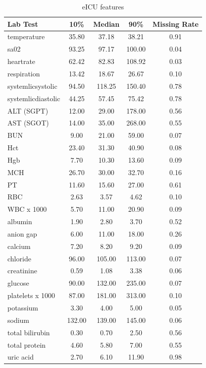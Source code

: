 \begin{table}[h!]
\centering
\caption{eICU features}
\label{app:table_eicu_features}
\begin{tabular}{lcccc}
    \toprule
    Lab Test & 10\% & Median & 90\% & Missing Rate \\
    \midrule
    temperature & 35.80 & 37.18 & 38.21 & 0.91 \\
    sa02 & 93.25 & 97.17 & 100.00 & 0.04 \\
    heartrate & 62.42 & 82.83 & 108.92 & 0.03 \\
    respiration & 13.42 & 18.67 & 26.67 & 0.10 \\
    systemlicsystolic & 94.50 & 118.25 & 150.40 & 0.78 \\
    systemlicdiastolic & 44.25 & 57.45 & 75.42 & 0.78 \\
    ALT (SGPT) & 12.00 & 29.00 & 178.00 & 0.56 \\
    AST (SGOT) & 14.00 & 35.00 & 268.00 & 0.55 \\
    BUN & 9.00 & 21.00 & 59.00 & 0.07 \\
    Hct & 23.40 & 31.30 & 40.90 & 0.08 \\
    Hgb & 7.70 & 10.30 & 13.60 & 0.09 \\
    MCH & 26.70 & 30.00 & 32.70 & 0.16 \\
    PT & 11.60 & 15.60 & 27.00 & 0.61 \\
    RBC & 2.63 & 3.57 & 4.62 & 0.10 \\
    WBC x 1000 & 5.70 & 11.00 & 20.90 & 0.09 \\
    albumin & 1.90 & 2.80 & 3.70 & 0.52 \\
    anion gap & 6.00 & 11.00 & 18.00 & 0.26 \\
    calcium & 7.20 & 8.20 & 9.20 & 0.09 \\
    chloride & 96.00 & 105.00 & 113.00 & 0.07 \\
    creatinine & 0.59 & 1.08 & 3.38 & 0.06 \\
    glucose & 90.00 & 132.00 & 235.00 & 0.07 \\
    platelets x 1000 & 87.00 & 181.00 & 313.00 & 0.10 \\
    potassium & 3.30 & 4.00 & 5.00 & 0.05 \\
    sodium & 132.00 & 139.00 & 145.00 & 0.06 \\
    total bilirubin & 0.30 & 0.70 & 2.50 & 0.56 \\
    total protein & 4.60 & 5.80 & 7.00 & 0.55 \\
    uric acid & 2.70 & 6.10 & 11.90 & 0.98 \\

\end{tabular}
\end{table}
